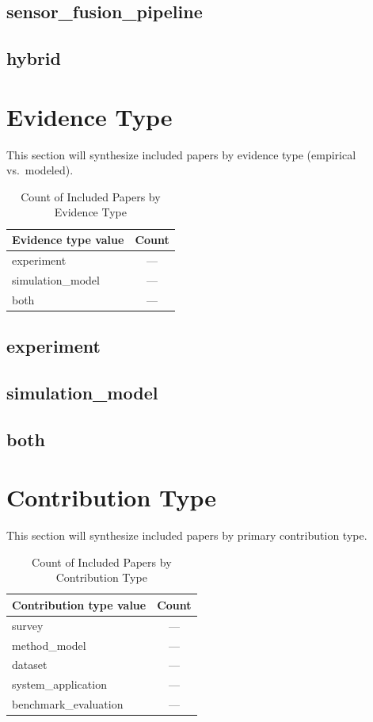 \documentclass[lettersize,journal]{IEEEtran}
\begin{document}
\subsection{sensor\_fusion\_pipeline}

\subsection{hybrid}


\section{Evidence Type}
This section will synthesize included papers by evidence type (empirical vs.\ modeled).

\begin{table}[H]
\caption{Count of Included Papers by Evidence Type}
\label{tab:evidence_type_counts}
\centering
\begin{tabular}{|l|c|}
\hline
Evidence type value & Count\\
\hline
experiment & ---\\
simulation\_model & ---\\
both & ---\\
\hline
\end{tabular}
\end{table}

\subsection{experiment}

\subsection{simulation\_model}

\subsection{both}


\section{Contribution Type}
This section will synthesize included papers by primary contribution type.

\begin{table}[H]
\caption{Count of Included Papers by Contribution Type}
\label{tab:contribution_type_counts}
\centering
\begin{tabular}{|l|c|}
\hline
Contribution type value & Count\\
\hline
survey & ---\\
method\_model & ---\\
dataset & ---\\
system\_application & ---\\
benchmark\_evaluation & ---\\
\hline
\end{tabular}
\end{table}
\end{document}
